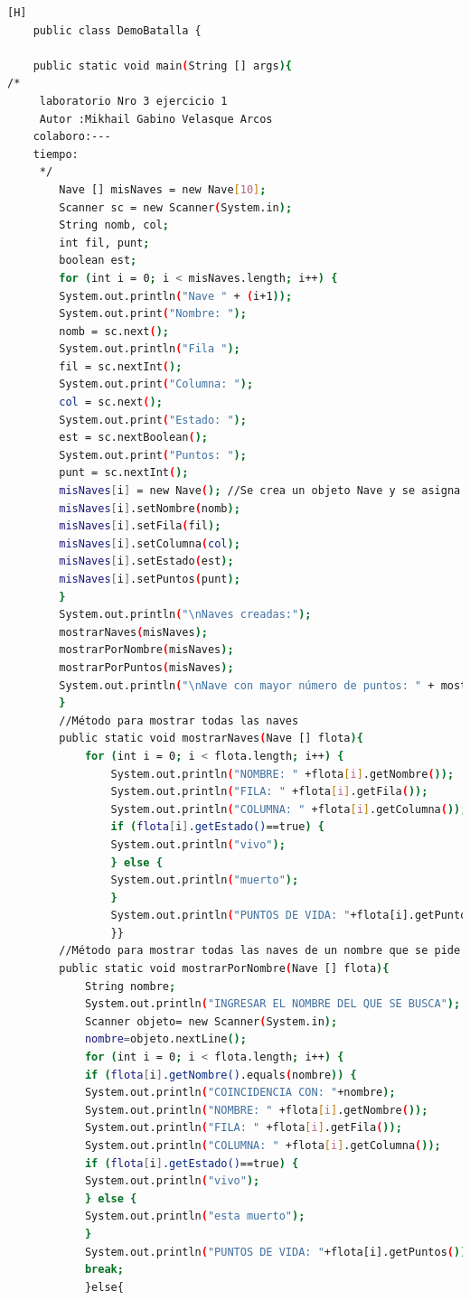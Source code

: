 \documentclass{article}
\begin{document}
	\begin{lstlisting}[language=bash,caption={Creando la clase principal de DemoBatalla.java}][H]
	public class DemoBatalla {
	
	public static void main(String [] args){
/*
	 laboratorio Nro 3 ejercicio 1
	 Autor :Mikhail Gabino Velasque Arcos
	colaboro:---
	tiempo:
	 */	
		Nave [] misNaves = new Nave[10];
		Scanner sc = new Scanner(System.in);
		String nomb, col;
		int fil, punt;
		boolean est;
		for (int i = 0; i < misNaves.length; i++) {
		System.out.println("Nave " + (i+1));
		System.out.print("Nombre: ");
		nomb = sc.next();
		System.out.println("Fila ");
		fil = sc.nextInt();
		System.out.print("Columna: ");
		col = sc.next();
		System.out.print("Estado: ");
		est = sc.nextBoolean();
		System.out.print("Puntos: ");
		punt = sc.nextInt();
		misNaves[i] = new Nave(); //Se crea un objeto Nave y se asigna su referencia a misNaves
		misNaves[i].setNombre(nomb);
		misNaves[i].setFila(fil);
		misNaves[i].setColumna(col);
		misNaves[i].setEstado(est);
		misNaves[i].setPuntos(punt);
		}
		System.out.println("\nNaves creadas:");
		mostrarNaves(misNaves);
		mostrarPorNombre(misNaves);
		mostrarPorPuntos(misNaves);
		System.out.println("\nNave con mayor número de puntos: " + mostrarMayorPuntos(misNaves));
		}
		//Método para mostrar todas las naves
		public static void mostrarNaves(Nave [] flota){
			for (int i = 0; i < flota.length; i++) {
				System.out.println("NOMBRE: " +flota[i].getNombre());
				System.out.println("FILA: " +flota[i].getFila());
				System.out.println("COLUMNA: " +flota[i].getColumna());
				if (flota[i].getEstado()==true) {
				System.out.println("vivo");
				} else {
				System.out.println("muerto");
				}
				System.out.println("PUNTOS DE VIDA: "+flota[i].getPuntos());
				}}
		//Método para mostrar todas las naves de un nombre que se pide por teclado
		public static void mostrarPorNombre(Nave [] flota){
			String nombre;
			System.out.println("INGRESAR EL NOMBRE DEL QUE SE BUSCA");
			Scanner objeto= new Scanner(System.in);
			nombre=objeto.nextLine();
			for (int i = 0; i < flota.length; i++) {
			if (flota[i].getNombre().equals(nombre)) {
			System.out.println("COINCIDENCIA CON: "+nombre);
			System.out.println("NOMBRE: " +flota[i].getNombre());
			System.out.println("FILA: " +flota[i].getFila());
			System.out.println("COLUMNA: " +flota[i].getColumna());
			if (flota[i].getEstado()==true) {
			System.out.println("vivo");
			} else {
			System.out.println("esta muerto");
			}
			System.out.println("PUNTOS DE VIDA: "+flota[i].getPuntos());
			break;
			}else{

\end{lstlisting}
\end{document}
